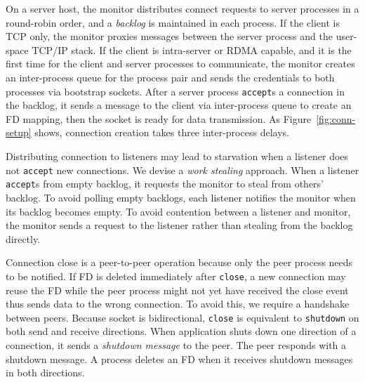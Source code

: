 On a server host, the monitor distributes connect requests to server processes in a round-robin order, and a \textit{backlog} is maintained in each process. If the client is TCP only, the monitor proxies messages between the server process and the user-space TCP/IP stack. If the client is intra-server or RDMA capable, and it is the first time for the client and server processes to communicate, the monitor creates an inter-process queue for the process pair and sends the credentials to both processes via bootstrap sockets. After a server process \texttt{accept}s a connection in the backlog, it sends a message to the client via inter-process queue to create an FD mapping, then the socket is ready for data transmission. As Figure~\ref{fig:conn-setup} shows, connection creation takes three inter-process delays.

Distributing connection to listeners may lead to starvation when a listener does not \texttt{accept} new connections. We devise a \textit{work stealing} approach. When a listener \texttt{accept}s from empty backlog, it requests the monitor to steal from others' backlog. To avoid polling empty backlogs, each listener notifies the monitor when its backlog becomes empty. To avoid contention between a listener and monitor, the monitor sends a request to the listener rather than stealing from the backlog directly.


Connection close is a peer-to-peer operation because only the peer process needs to be notified. If FD is deleted immediately after \texttt{close}, a new connection may reuse the FD while the peer process might not yet have received the close event thus sends data to the wrong connection. To avoid this, we require a handshake between peers.
Because socket is bidirectional, \texttt{close} is equivalent to \texttt{shutdown} on both send and receive directions.
When application shuts down one direction of a connection, it sends a \textit{shutdown message} to the peer. The peer responds with a shutdown message. A process deletes an FD when it receives shutdown messages in both directions.


